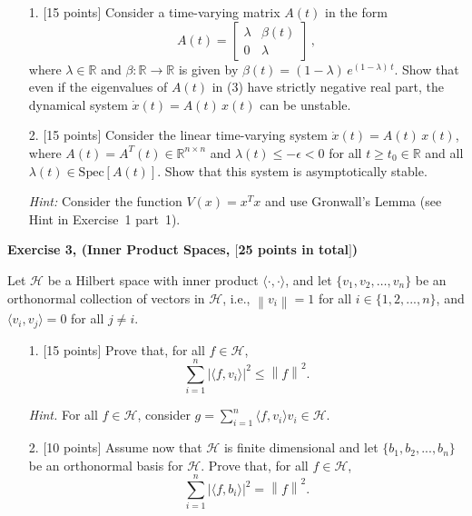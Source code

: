 \documentclass[a4paper,10.5pt]{article}
\newcommand{\R}{\mathbb{R}}
\begin{document}
\clearpage


\begin{itemize}
\item[1.] $[$15 points$]$  Consider a time-varying matrix $A(t)$ in the form
\begin{equation}
A(t) = \begin{bmatrix}\lambda & \beta(t)\\ 0 & \lambda\end{bmatrix}\,, \tag{3}
\end{equation}
where $\lambda \in \mathbb{R}$ and $\beta\colon \R \to \mathbb{R}$ is given by $\beta(t) = ({1 - \lambda})\, e^{(1 - \lambda)\, t}$. Show that even if the eigenvalues of $A(t)$ in (3) have strictly negative real part,  the dynamical system $\dot{x}(t) = A(t)\, x(t)$ can be unstable.


\item[2.] $[$15 points$]$ Consider the linear time-varying system $\dot{x}(t) = A(t)\, x(t)$, where $A(t) = A^T(t) \in \R^{n \times n}$ and $\lambda(t) \leq -\epsilon < 0$ for all $t \geq t_0 \in \mathbb{R}$ and all $\lambda(t) \in \text{Spec}[A(t)]$. Show that this system is asymptotically stable.

{\em Hint:} Consider the function $V(x)=x^Tx$ and use Gronwall's Lemma (see Hint in Exercise~1 part~1).
\end{itemize} 

\clearpage

{\bf Exercise 3, (Inner Product Spaces, $[$25 points in total$]$)}

Let $\mathcal{H}$ be a Hilbert space with inner product $ \langle \cdot, \cdot \rangle$, and let $\{ v_1, v_2, \ldots, v_n \}$ be an orthonormal collection of vectors in $\mathcal{H}$, i.e., $\left\| v_i \right\| = 1$ for all $i \in \{1, 2, ..., n\}$, and $\langle v_i, v_j\rangle = 0$ for all $j \neq i$.

\begin{itemize}
\item[1.] $[$15 points$]$ Prove that, for all $f \in \mathcal{H}$, 
$$ \sum_{ i=1 }^{n} | \langle  f, v_i \rangle |^2  \leq \left\| f \right\|^2.$$

\textit{Hint.} For all $f \in \mathcal{H}$, consider $g = \sum_{ i=1 }^{n} \langle f, v_i \rangle v_i \in \mathcal{H}$.

\item[2.] $[$10 points$]$ Assume now that $\mathcal{H}$ is finite dimensional and let $\{b_1, b_2, ..., b_n\}$ be an orthonormal basis for $\mathcal{H}$. Prove that, for all $f \in \mathcal{H}$,
$$ \sum_{ i=1 }^{n} | \langle  f, b_i \rangle |^2  = \left\| f \right\|^2.$$
\end{itemize}
\end{document}
